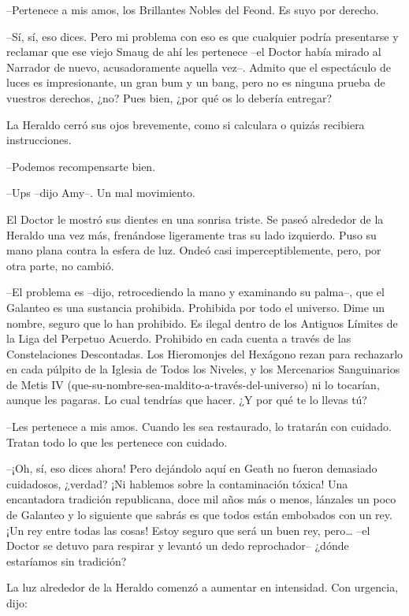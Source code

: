 {--Pertenece a mis amos, los Brillantes Nobles del Feond. Es suyo por
derecho.}

{--Sí, sí, eso dices. Pero mi problema con eso es que cualquier podría
	presentarse y reclamar que ese viejo Smaug de ahí les pertenece --el
	Doctor había mirado al Narrador de nuevo, acusadoramente aquella vez--.
	Admito que el espectáculo de luces es impresionante, un gran bum y un
	bang, pero no es ninguna prueba de vuestros derechos, ¿no? Pues bien,
¿por qué os lo debería entregar?}

{La Heraldo cerró sus ojos brevemente, como si calculara o quizás
recibiera instrucciones.}

{--Podemos recompensarte bien.}

{--Ups --dijo Amy--. Un mal movimiento.}

{El Doctor le mostró sus dientes en una sonrisa triste. Se paseó
	alrededor de la Heraldo una vez más, frenándose ligeramente tras su lado
	izquierdo. Puso su mano plana contra la esfera de luz. Ondeó casi
imperceptiblemente, pero, por otra parte, no cambió.}

{--El problema es --dijo, retrocediendo la mano y examinando su
	palma--, que el Galanteo es una sustancia prohibida. Prohibida por todo
	el universo. Dime un nombre, seguro que lo han prohibido. Es ilegal
	dentro de los Antiguos Límites de la Liga del Perpetuo Acuerdo.
	Prohibido en cada cuenta a través de las Constelaciones Descontadas. Los
	Hieromonjes del Hexágono rezan para rechazarlo en cada púlpito de la
	Iglesia de Todos los Niveles, y los Mercenarios Sanguinarios de Metis IV
	(que-su-nombre-sea-maldito-a-través-del-universo) ni lo
	tocarían, aunque les pagaras. Lo cual tendrías que hacer. ¿Y por qué te
lo llevas tú?}

{--Les pertenece a mis amos. Cuando les sea restaurado, lo tratarán
con cuidado. Tratan todo lo que les pertenece con cuidado.}

{--¡Oh, sí, eso dices ahora! Pero dejándolo aquí en Geath no fueron
	demasiado cuidadosos, ¿verdad? ¡Ni hablemos sobre la contaminación
	tóxica! Una encantadora tradición republicana, doce mil años más o
	menos, lánzales un poco de Galanteo y lo siguiente que sabrás es que
	todos están embobados con un rey. ¡Un rey entre todas las cosas! Estoy
	seguro que será un buen rey, pero\ldots{} --el Doctor se detuvo para
	respirar y levantó un dedo reprochador-- ¿dónde estaríamos sin
tradición?}

{La luz alrededor de la Heraldo comenzó a aumentar en intensidad. Con
urgencia, dijo:}

